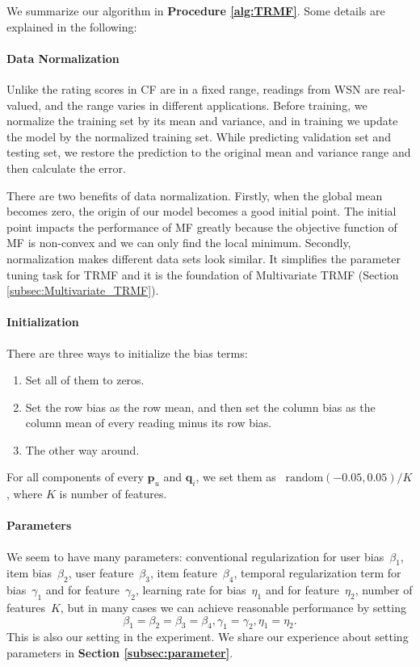 We summarize our algorithm in \textbf{Procedure \ref{alg:TRMF}}.
Some details are explained in the following:

\paragraph*{Data Normalization}

Unlike the rating scores in CF are in a fixed range, readings from WSN are real-valued, and the range varies in different applications.
Before training, we normalize the training set by its mean and variance, and in training we update the model by the normalized training set.
While predicting validation set and testing set, we restore the prediction to the original mean and variance range and then calculate the error.

There are two benefits of data normalization.
Firstly, when the global mean becomes zero, the origin of our model becomes a good initial point.
The initial point impacts the performance of MF greatly because the objective function of MF is non-convex and we can only find the local minimum.
Secondly, normalization makes different data sets look similar.
It simplifies the parameter tuning task for TRMF and it is the foundation of Multivariate TRMF (Section \ref{subsec:Multivariate_TRMF}). 


\paragraph*{Initialization}

There are three ways to initialize the bias terms:
\begin{enumerate}
	\setlength {\itemsep}{-5pt}
	\item Set all of them to zeros.
	\item Set the row bias as the row mean, and then set the column bias as the column mean of every reading minus its row bias.
	\item The other way around.
\end{enumerate}
For all components of every $\mathbf{p}_{u}$ and $\mathbf{q}_{i}$, we set them as ~$\mbox{random}(-0.05,0.05)/K$, where $K$ is number of features.

\paragraph*{Parameters}

We seem to have many parameters: conventional regularization for user bias~$\beta_1$, item bias~$\beta_2$, user feature~$\beta_3$, item feature~$\beta_4$, temporal regularization term for bias~$\gamma_1$ and for feature~$\gamma_2$, learning rate for bias~$\eta_1$ and for feature~$\eta_2$, number of features~$K$, but in many cases we can achieve reasonable performance by setting 
\begin{equation*}\beta_1 = \beta_2 = \beta_3 = \beta_4, \gamma_1 = \gamma_2, \eta_1 = \eta_2. \end{equation*}
This is also our setting in the experiment.
We share our experience about setting parameters in \textbf{Section \ref{subsec:parameter}}.

